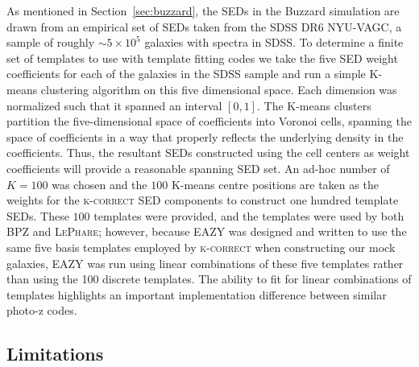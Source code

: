 As mentioned in Section~\ref{sec:buzzard}, the SEDs in the Buzzard simulation are drawn from an empirical set of SEDs taken from the SDSS DR6 NYU-VAGC, a sample of roughly $\sim5\times 10^{5}$ galaxies with spectra in SDSS.
To determine a finite set of templates to use with template fitting codes we take the five SED weight coefficients for each of the galaxies in the SDSS sample and run a simple K-means clustering algorithm on this five dimensional space.
Each dimension was normalized such that it spanned an interval $[0,1]$.
The K-means clusters partition the five-dimensional space of coefficients into Voronoi cells, spanning the space of coefficients in a way that properly reflects the underlying density in the coefficients.
Thus, the resultant SEDs constructed using the cell centers as weight coefficients will provide a reasonable spanning SED set.
An ad-hoc number of $K=100$ was chosen and the $100$ K-means centre positions are taken as the weights for the \textsc{k-correct} SED components to construct one hundred template SEDs. These $100$ templates were provided,
and the templates were used by both \textsc{BPZ} and \textsc{LePhare}; however, because EAZY was designed and written to use the same five basis templates employed by \textsc{k-correct} when constructing our mock galaxies, EAZY was run using linear combinations of these five templates rather than using the 100 discrete templates.
The ability to fit for linear combinations of templates highlights an important implementation difference between similar photo-z codes.

\subsection{Limitations}
\label{sec:buzzlimitations}

